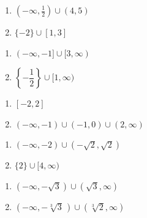 \begin{multicols}{2}
\begin{enumerate}
\setcounter{enumi}{\value{HW}}

\item $(-\infty, \frac{1}{2}) \cup (4, 5)$
\item $\{-2\} \cup [1, 3]$

\setcounter{HW}{\value{enumi}}
\end{enumerate}
\end{multicols}

\begin{multicols}{2}
\begin{enumerate}
\setcounter{enumi}{\value{HW}}

\item $(-\infty, -1] \cup [3, \infty)$

\item $\left\{ -\dfrac{1}{2} \right\} \cup [1, \infty)$

\setcounter{HW}{\value{enumi}}
\end{enumerate}
\end{multicols}

\begin{multicols}{2}
\begin{enumerate}
\setcounter{enumi}{\value{HW}}

\item $[-2,2]$
\item $\left(-\infty, -1 \right) \cup \left(-1, 0 \right) \cup (2, \infty)$

\setcounter{HW}{\value{enumi}}
\end{enumerate}
\end{multicols}

\begin{multicols}{2}
\begin{enumerate}
\setcounter{enumi}{\value{HW}}


\item $(-\infty, -2) \cup \left(-\sqrt{2}, \sqrt{2} \right)$
\item $\{2 \} \cup [4,\infty)$

\setcounter{HW}{\value{enumi}}
\end{enumerate}
\end{multicols}

\begin{multicols}{2}
\begin{enumerate}
\setcounter{enumi}{\value{HW}}


\item $(-\infty, -\sqrt{3}) \cup (\sqrt{3}, \infty)$
\item $(-\infty, -\sqrt[3]{3}\,) \cup (\sqrt[3]{2}, \infty)$

\setcounter{HW}{\value{enumi}}
\end{enumerate}
\end{multicols}

